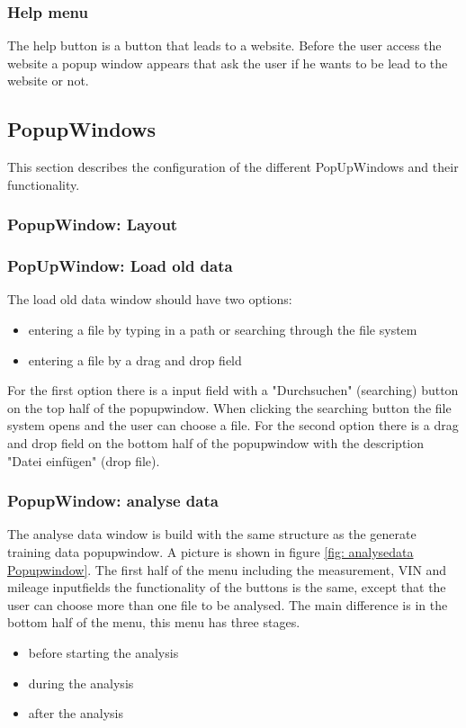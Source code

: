 \documentclass[]{scrreprt}
\begin{document}
\subsubsection{Help menu}

The help button is a button that leads to a website. Before the user access the website a popup window appears that ask the user if he wants to be lead to the website or not. 



\subsection{PopupWindows}
This section describes the configuration of the different PopUpWindows and their functionality.

\subsubsection{PopupWindow: Layout}\label{cap: PopupWindow_layout}


\subsubsection{PopUpWindow: Load old data}\label{cap: PopupWindow_loadoldata}
The load old data window should have two options: 
\begin{itemize}
    \item entering a file by typing in a path or searching through the file system
    \item entering a file by a drag and drop field 
\end{itemize}
For the first option there is a input field with a "Durchsuchen" (searching) button on the top half of the popupwindow. When clicking the searching button the file system opens and the user can choose a file.
For the second option there is a drag and drop field on the bottom half of the popupwindow with the description "Datei einfügen" (drop file). 


\subsubsection{PopupWindow: analyse data}\label{cap: PopupWindow_analysedata}

The analyse data window is build with the same structure as the generate training data popupwindow. A picture is shown in figure \ref{fig: analysedata Popupwindow}. 
The first half of the menu including the measurement, VIN and mileage inputfields the functionality of the buttons is the same, except that the user can choose more than one file to be analysed. The main difference is in the bottom half of the menu, this menu has three stages. 
\begin{itemize}
    \item before starting the analysis 
    \item during the analysis
    \item after the analysis
\end{itemize}
\end{document}

